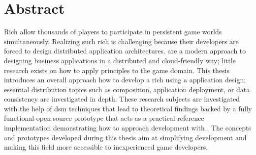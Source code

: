 \section*{Abstract}

Rich \ogs{} allow thousands of players to participate in persistent game worlds
simultaneously. Realizing such rich \ogs{} is challenging because their
developers are forced to design distributed application architectures. \mssuc{}
are a modern approach to designing business applications in a distributed and
cloud-friendly way; little research exists on how to apply \ms{} principles to
the game domain. This thesis introduces an overall approach how to develop a
rich \og{} using a \ms{} application design; essential distribution topics such
as \ms{} composition, application deployment, or data consistency are
investigated in depth. These research subjects are investigated with the help of
\gls{dsm} techniques that lead to theoretical findings backed by a fully
functional open source prototype that acts as a practical reference
implementation demonstrating how to approach \og{} development with \mss{}. The
concepts and prototypes developed during this thesis aim at simplifying \og{}
development and making this field more accessible to inexperienced game
developers. 
